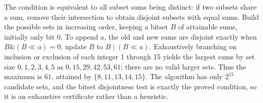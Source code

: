 The condition is equivalent to all subset sums being distinct: if two subsets share a sum, remove their intersection to obtain disjoint subsets with equal sums. Build the possible sets in increasing order, keeping a bitset $B$ of attainable sums, initially only bit 0. To append $a$, the old and new sums are disjoint exactly when $B\mathbin{\&}(B\ll a)=0$; update $B$ to $B\mathbin{|}(B\ll a)$. Exhaustively branching on inclusion or exclusion of each integer 1 through 15 yields the largest sums by set size $0,1,2,3,4,5$ as $0,15,29,42,53,61$; there are no valid larger sets. Thus the maximum is $\boxed{61}$, attained by $\{8,11,13,14,15\}$. The algorithm has only $2^{15}$ candidate sets, and the bitset disjointness test is exactly the proved condition, so it is an exhaustive certificate rather than a heuristic.
